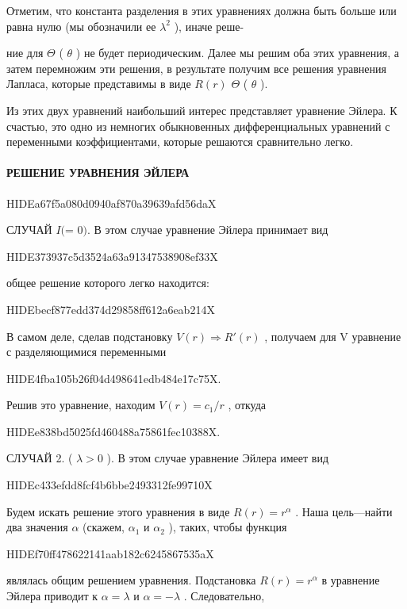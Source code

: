 \documentclass[
  ukrainian,
]{article}
\begin{document}
Отметим, что константа разделения в этих уравнениях должна быть больше
или равна нулю (мы обозначили ее \(\lambda^2\) ), иначе реше-

ние для \(\Theta\) ( \(\theta\) ) не будет периодическим. Далее мы решим
оба этих уравнения, а затем перемножим эти решения, в результате получим
все решения уравнения Лапласа, которые представимы в виде \(R (r)\)
\(\Theta\) ( \(\theta\) ).

Из этих двух уравнений наибольший интерес представляет уравнение Эйлера.
К счастью, это одно из немногих обыкновенных дифференциальных уравнений
с переменными коэффициентами, которые решаются сравнительно легко.

\paragraph{РЕШЕНИЕ УРАВНЕНИЯ
ЭЙЛЕРА}\label{ux440ux435ux448ux435ux43dux438ux435-ux443ux440ux430ux432ux43dux435ux43dux438ux44f-ux44dux439ux43bux435ux440ux430}

HIDEa67f5a080d0940af870a39639afd56daX

СЛУЧАЙ \(I (\)\lambda = 0\()\). В этом случае уравнение Эйлера принимает
вид

HIDE373937c5d3524a63a91347538908ef33X

общее решение которого легко находится:

HIDEbecf877edd374d29858ff612a6eab214X

В самом деле, сделав подстановку
\(V\left(r\right) \Rightarrow R'\left(r\right)\) , получаем для V
уравнение с разделяющимися переменными

HIDE4fba105b26f04d498641edb484e17c75X.

Решив это уравнение, находим \(V\left(r\right)=c_{1}/r\) , откуда

HIDEe838bd5025fd460488a75861fec10388X.

СЛУЧАЙ 2. ( \(\lambda > 0\) ). В этом случае уравнение Эйлера имеет вид

HIDEc433efdd8fcf4b6bbe2493312fe99710X

Будем искать решение этого уравнения в виде \(R(r)=r^{\alpha}\) . Наша
цель---найти два значения \(\alpha\) (скажем, \(\alpha_1\) и
\(\alpha_2\) ), таких, чтобы функция

HIDEf70ff478622141aab182c6245867535aX

являлась общим решением уравнения. Подстановка \(R(r) = r^{\alpha}\) в
уравнение Эйлера приводит к \(\alpha = \lambda\) и \(\alpha = -\lambda\)
. Следовательно,
\end{document}
